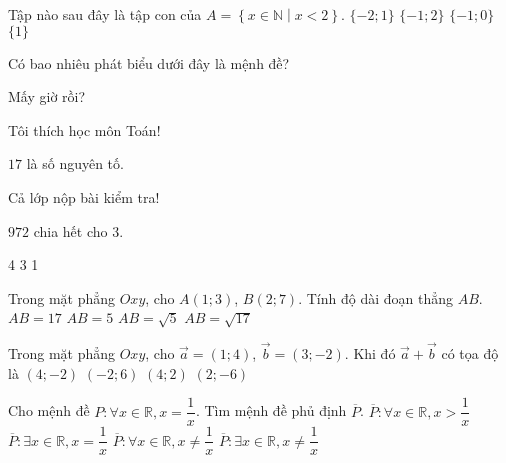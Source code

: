 \begin{ex}%
Tập nào sau đây là tập con của $A=\left\{x\in\mathbb{N}\middle| x<2\right\}$.
\choice
{$\{-2;1\}$}
{$\{-1;2\}$}
{$\{-1;0\}$}
{\True $\{1\}$}
\end{ex}

\begin{ex}%
Có bao nhiêu phát biểu dưới đây là mệnh đề?
\begin{listEX}[2]
	\item Mấy giờ rồi?
	\item Tôi thích học môn Toán!
	\item $17$ là số nguyên tố.
	\item Cả lớp nộp bài kiểm tra!
	\item $972$ chia hết cho $3$.
\end{listEX}
\choice
{4}
{3}
{1}
{}
\end{ex}

\begin{ex}%
Trong mặt phẳng $Oxy$, cho $A(1;3)$, $B(2;7)$. Tính độ dài đoạn thẳng $AB$.
\choice
{$AB=17$}
{$AB=5$}
{$AB=\sqrt{5}$}
{\True $AB=\sqrt{17}$}
\end{ex}

\begin{ex}%
Trong mặt phẳng $Oxy$, cho $\vec{a}=(1;4)$, $\vec{b}=(3;-2)$. Khi đó $\vec{a}+\vec{b}$ có tọa độ là
\choice
{$(4;-2)$}
{$(-2;6)$}
{\True $(4;2)$}
{$(2;-6)$}
\end{ex}

\begin{ex}%
Cho mệnh đề $P:\forall x \in \mathbb{R}, x=\dfrac{1}{x}$. Tìm mệnh đề phủ định $\overline{P}$.
\choice
{$\overline{P}: \forall x \in \mathbb{R}, x>\dfrac{1}{x}$}
{$\overline{P}: \exists x \in \mathbb{R}, x=\dfrac{1}{x}$}
{$\overline{P}: \forall x \in \mathbb{R}, x\neq\dfrac{1}{x}$}
{\True $\overline{P}: \exists x \in \mathbb{R}, x\neq\dfrac{1}{x}$}
\end{ex}

